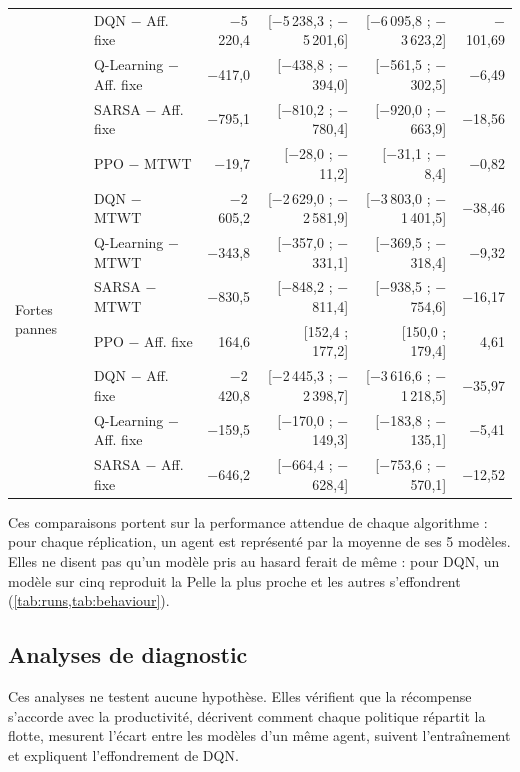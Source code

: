\documentclass[11pt,a4paper]{article}
\newif\ifrevmarks
\newcommand{\revtag}[1]{\ifrevmarks\textsuperscript{\textcolor{red!70!black}{\scriptsize[#1]}}\fi}
\newenvironment{revbloc}[1]{\par\ifrevmarks\color{revcolor}\noindent\revtag{#1}\ \fi}{\par}
\newif\ifcorrmarks
\newcommand{\corr}[1]{\ifcorrmarks\textcolor{corrcolor}{#1}\else#1\fi}
\newenvironment{corrbloc}{\par\ifcorrmarks\color{corrcolor}\fi}{\par}
\begin{document}
\begin{revbloc}{T31}
\begin{corrbloc}
\begin{table}[H]
\begin{tabular}{@{}llrrrr@{}}
 & DQN $-$ Aff. fixe & $-$5\,220{,}4 & [$-$5\,238{,}3 ; $-$5\,201{,}6] & [$-$6\,095{,}8 ; $-$3\,623{,}2] & $-$101{,}69 \\
 & Q-Learning $-$ Aff. fixe & $-$417{,}0 & [$-$438{,}8 ; $-$394{,}0] & [$-$561{,}5 ; $-$302{,}5] & $-$6{,}49 \\
 & SARSA $-$ Aff. fixe & $-$795{,}1 & [$-$810{,}2 ; $-$780{,}4] & [$-$920{,}0 ; $-$663{,}9] & $-$18{,}56 \\
\midrule
\multirow{8}{*}{Fortes pannes} & PPO $-$ MTWT & $-$19{,}7 & [$-$28{,}0 ; $-$11{,}2] & [$-$31{,}1 ; $-$8{,}4] & $-$0{,}82 \\
 & DQN $-$ MTWT & $-$2\,605{,}2 & [$-$2\,629{,}0 ; $-$2\,581{,}9] & [$-$3\,803{,}0 ; $-$1\,401{,}5] & $-$38{,}46 \\
 & Q-Learning $-$ MTWT & $-$343{,}8 & [$-$357{,}0 ; $-$331{,}1] & [$-$369{,}5 ; $-$318{,}4] & $-$9{,}32 \\
 & SARSA $-$ MTWT & $-$830{,}5 & [$-$848{,}2 ; $-$811{,}4] & [$-$938{,}5 ; $-$754{,}6] & $-$16{,}17 \\
 & PPO $-$ Aff. fixe & 164{,}6 & [152{,}4 ; 177{,}2] & [150{,}0 ; 179{,}4] & 4{,}61 \\
 & DQN $-$ Aff. fixe & $-$2\,420{,}8 & [$-$2\,445{,}3 ; $-$2\,398{,}7] & [$-$3\,616{,}6 ; $-$1\,218{,}5] & $-$35{,}97 \\
 & Q-Learning $-$ Aff. fixe & $-$159{,}5 & [$-$170{,}0 ; $-$149{,}3] & [$-$183{,}8 ; $-$135{,}1] & $-$5{,}41 \\
 & SARSA $-$ Aff. fixe & $-$646{,}2 & [$-$664{,}4 ; $-$628{,}4] & [$-$753{,}6 ; $-$570{,}1] & $-$12{,}52 \\
\bottomrule
\end{tabular}
\end{table}
\end{corrbloc}

Ces comparaisons portent sur la performance attendue de chaque algorithme : pour chaque réplication, un agent est représenté par la moyenne de ses 5 modèles. Elles ne disent pas qu'un modèle pris au hasard ferait de même : pour DQN, un modèle sur cinq reproduit la Pelle la plus proche et les autres s'effondrent (\cref{tab:runs,tab:behaviour}).
\end{revbloc}

\subsection{\corr{Analyses de diagnostic}}
\label{sec:diagnostics}

\begin{corrbloc}
Ces analyses ne testent aucune hypothèse. Elles vérifient que la récompense s'accorde avec la productivité, décrivent comment chaque politique répartit la flotte, mesurent l'écart entre les modèles d'un même agent, suivent l'entraînement et expliquent l'effondrement de DQN.
\end{corrbloc}
\end{document}
